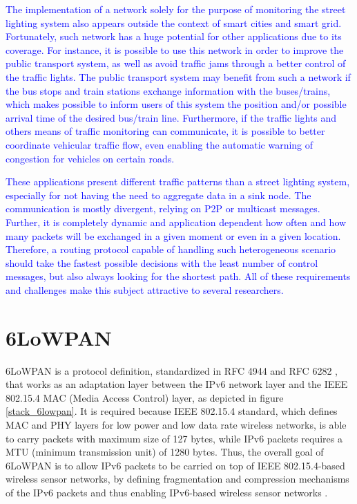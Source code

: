 \documentclass[authoryear,preprint,review,12pt]{elsarticle}
\newcommand{\rev}{\textcolor{blue}}
\begin{document}
\rev{The implementation of a network solely for the purpose of monitoring the street lighting system also appears outside the context of smart cities and smart grid. Fortunately, such network has a huge potential for other applications due to its coverage. For instance, it is possible to use this network in order to improve the public transport system, as well as avoid traffic jams through a better control of the traffic lights. The public transport system may benefit from such a network if the bus stops and train stations exchange information with the buses/trains, which makes possible to inform users of this system the position and/or possible arrival time of the desired bus/train line. Furthermore, if the traffic lights and others means of traffic monitoring can communicate, it is possible to better coordinate vehicular traffic flow, even enabling the automatic warning of congestion for vehicles on certain roads.}

\rev{These applications present different traffic patterns than a street lighting system, especially for not having the need to aggregate data in a sink node. The communication is mostly divergent, relying on P2P or multicast messages. Further, it is completely dynamic and application dependent how often and how many packets will be exchanged in a given moment or even in a given location. Therefore, a routing protocol capable of handling such heterogeneous scenario should take the fastest possible decisions with the least number of control messages, but also always looking for the shortest path. All of these requirements and challenges make this subject attractive to several researchers.}


\section{6LoWPAN}
\label{sec6LoWPAN}

6LoWPAN is a protocol definition, standardized in RFC 4944 \citep{RFC4944} and RFC 6282 \citep{RFC6282}, that works as an adaptation layer between the IPv6 network layer and the IEEE 802.15.4 MAC (Media Access Control) layer, as depicted in figure \ref{stack_6lowpan}. It is required because IEEE 802.15.4 standard, which defines MAC and PHY layers for low power and low data rate wireless networks, is able to carry packets with maximum size of 127 bytes, while IPv6 packets requires a MTU (minimum transmission unit) of 1280 bytes. Thus, the overall goal of 6LoWPAN is to allow IPv6 packets to be carried on top of IEEE 802.15.4-based wireless sensor networks, by defining fragmentation and compression mechanisms of the IPv6 packets and thus enabling IPv6-based wireless sensor networks \citep{Mulligan_6LoWPAN_2007}.
\end{document}
